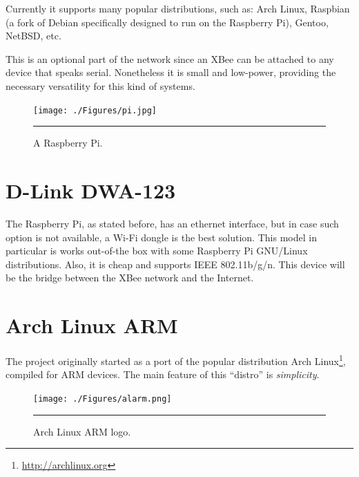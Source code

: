 Currently it supports many popular distributions, such as: Arch Linux, Raspbian (a fork of Debian specifically designed to run on the Raspberry Pi), Gentoo, NetBSD, etc.

This is an optional part of the network since an XBee can be attached to any device that speaks serial. Nonetheless it is small and low-power, providing the necessary versatility for this kind of systems.

\begin{figure}[htbp]
    \centering
    \texttt{[image: ./Figures/pi.jpg]}
        \rule{35em}{0.5pt}
        \caption[Raspberry Pi]{A Raspberry Pi.}
    \label{fig:RaspberryPi}
\end{figure}


\section{D-Link DWA-123}

The Raspberry Pi, as stated before, has an ethernet interface, but in case such option is not available, a Wi-Fi dongle is the best solution. This model in particular is works out-of-the box with some Raspberry Pi GNU/Linux distributions. Also, it is cheap and supports IEEE 802.11b/g/n. This device will be the bridge between the XBee network and the Internet.


\section{Arch Linux ARM}

The project originally started as a port of the popular distribution Arch Linux\footnote{\url{http://archlinux.org}}, compiled for ARM devices. The main feature of this ``distro'' is \emph{simplicity}.

\begin{figure}[htbp]
    \centering
    \texttt{[image: ./Figures/alarm.png]}
        \rule{35em}{0.5pt}
        \caption[Arch Linux ARM Logo]{Arch Linux ARM logo.}
    \label{fig:alarm_logo}
\end{figure}

